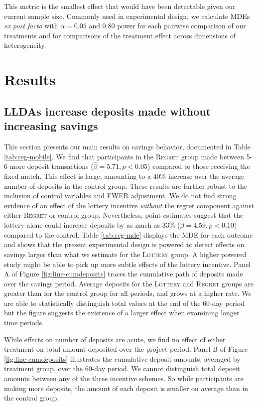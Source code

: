 \documentclass[12pt]{article}
\begin{document}
		This metric is the smallest effect that would have been detectable given our current sample size. Commonly used in experimental design, we calculate MDEs \textit{ex post facto} with $\alpha = 0.05$ and 0.80 power for each pairwise comparison of our treatments and for comparisons of the treatment effect across dimensions of heterogeneity.

\section{Results} \label{sec:results}

	\subsection{LLDAs increase deposits made without increasing savings}

		This section presents our main results on savings behavior, documented in Table \ref{tab:reg-mobile}. We find that participants in the \textsc{Regret} group made between 5-6 more deposit transactions ($\hat \beta = 5.71, p < 0.05$) compared to those receiving the fixed match. This effect is large, amounting to a 40\% increase over the average number of deposits in the control group. These results are further robust to the inclusion of control variables and FWER adjustment. We do not find strong evidence of an effect of the lottery incentive \textit{without} the regret component against either \textsc{Regret} or control group. Nevertheless, point estimates suggest that the lottery alone could increase deposits by as much as 33\% ($\hat \beta = 4.59, p < 0.10$) compared to the control. Table \ref{tab:reg-mde} displays the MDE for each outcome and shows that the present experimental design is powered to detect effects on savings larger than what we estimate for the \textsc{Lottery} group. A higher powered study might be able to pick up more subtle effects of the lottery incentive. Panel A of Figure \ref{fig:line-cumdeposits} traces the cumulative path of deposits made over the savings period. Average deposits for the \textsc{Lottery} and \textsc{Regret} groups are greater than for the control group for all periods, and grows at a higher rate. We are able to statistically distinguish total values at the end of the 60-day period but the figure suggests the existence of a larger effect when examining longer time periods.


		While effects on number of deposits are acute, we find no effect of either treatment on total amount deposited over the project period. Panel B of Figure \ref{fig:line-cumdeposits} illustrates the cumulative deposit amounts, averaged by treatment group, over the 60-day period. We cannot distinguish total deposit amounts between any of the three incentive schemes. So while participants are making more deposits, the amount of each deposit is smaller on average than in the control group.
\end{document}
